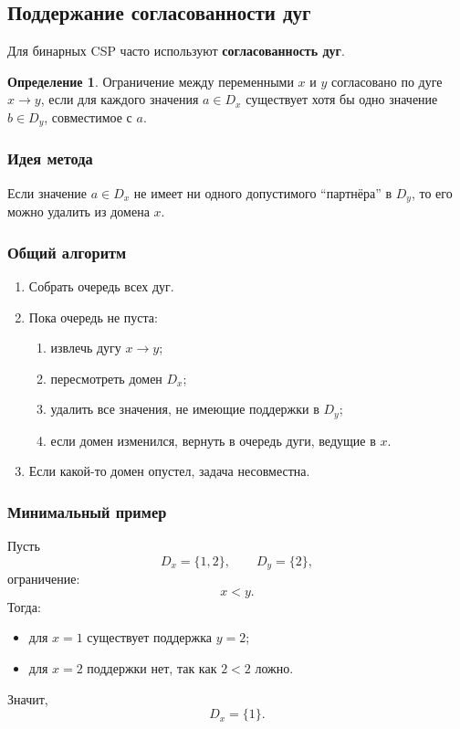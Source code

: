 \documentclass[12pt,a4paper]{article}
\theoremstyle{definition}
\newtheorem{definition}{Определение}[section]
\theoremstyle{plain}
\begin{document}
\subsection{Поддержание согласованности дуг}
Для бинарных CSP часто используют \textbf{согласованность дуг}.

\begin{definition}
Ограничение между переменными $x$ и $y$ согласовано по дуге $x\to y$, если для каждого значения $a\in D_x$ существует хотя бы одно значение $b\in D_y$, совместимое с $a$.
\end{definition}

\subsubsection{Идея метода}
Если значение $a\in D_x$ не имеет ни одного допустимого ``партнёра'' в $D_y$, то его можно удалить из домена $x$.

\subsubsection{Общий алгоритм}
\begin{enumerate}
\item Собрать очередь всех дуг.
\item Пока очередь не пуста:
\begin{enumerate}
\item извлечь дугу $x\to y$;
\item пересмотреть домен $D_x$;
\item удалить все значения, не имеющие поддержки в $D_y$;
\item если домен изменился, вернуть в очередь дуги, ведущие в $x$.
\end{enumerate}
\item Если какой-то домен опустел, задача несовместна.
\end{enumerate}

\subsubsection{Минимальный пример}
Пусть
\[
D_x=\{1,2\},\qquad D_y=\{2\},
\]
ограничение:
\[
x<y.
\]
Тогда:
\begin{itemize}
\item для $x=1$ существует поддержка $y=2$;
\item для $x=2$ поддержки нет, так как $2<2$ ложно.
\end{itemize}
Значит,
\[
D_x=\{1\}.
\]
\end{document}
